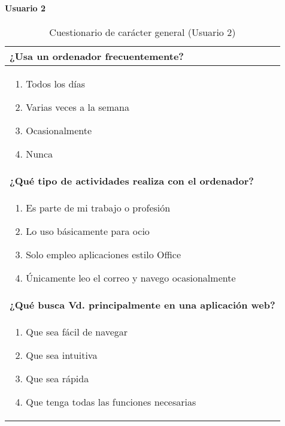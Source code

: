 \paragraph*{Usuario 2}
\begin{table}[H]
\centering
\caption{Cuestionario de carácter general (Usuario 2)}
\begin{tabular}{p{36em}}
\toprule
\rowcolor[rgb]{ .949,  .949,  .949} \textbf{¿Usa un ordenador frecuentemente?} \\ \midrule
\vspace{-4mm}
\begin{enumerate}
\item  \colorbox{blue!30}{Todos los días}
\item Varias veces a la semana
\item Ocasionalmente
\item Nunca
\end{enumerate} \\ \midrule
\rowcolor[rgb]{ .949,  .949,  .949} \textbf{¿Qué tipo de actividades realiza con el ordenador?} \\ \midrule
\vspace{-4mm}
\begin{enumerate}
\item  \colorbox{blue!30}{Es parte de mi trabajo o profesión}
\item Lo uso básicamente para ocio
\item Solo empleo aplicaciones estilo Office
\item Únicamente leo el correo y navego ocasionalmente
\end{enumerate} \\ \midrule
\rowcolor[rgb]{ .949,  .949,  .949} \textbf{¿Qué busca Vd. principalmente en una aplicación web?} \\ \midrule
\vspace{-4mm}
\begin{enumerate}
\item  \colorbox{blue!30}{Que sea fácil de navegar}
\item Que sea intuitiva
\item Que sea rápida
\item Que tenga todas las funciones necesarias
\end{enumerate} \\ \bottomrule
\end{tabular}
\end{table}


